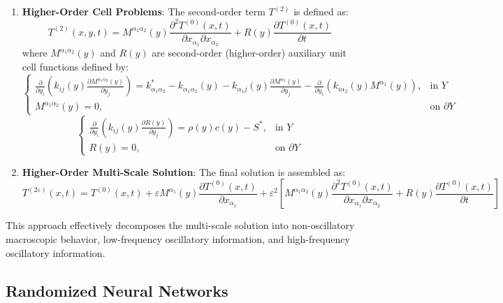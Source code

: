 \documentclass[11pt]{article}
\begin{document}
\begin{enumerate}
    \item \textbf{Higher-Order Cell Problems}: The second-order term $T^{(2)}$ is defined as:
    \begin{equation}
    T^{(2)}(x,y,t) = M^{\alpha_1\alpha_2}(y)\frac{\partial^2 T^{(0)}(x,t)}{\partial x_{\alpha_1}\partial x_{\alpha_2}} + R(y)\frac{\partial T^{(0)}(x,t)}{\partial t}
    \end{equation}
    where $M^{\alpha_1\alpha_2}(y)$ and $R(y)$ are second-order (higher-order) auxiliary unit cell functions defined by:
    \begin{equation}
    \begin{cases}
    \frac{\partial}{\partial y_i}\left(k_{ij}(y)\frac{\partial M^{\alpha_1\alpha_2}(y)}{\partial y_j}\right) = k^*_{\alpha_1\alpha_2} - k_{\alpha_1\alpha_2}(y) - k_{\alpha_1 j}(y)\frac{\partial M^{\alpha_2}(y)}{\partial y_j} - \frac{\partial}{\partial y_i}\left(k_{i\alpha_2}(y)M^{\alpha_1}(y)\right), & \text{in } Y \\
    M^{\alpha_1\alpha_2}(y) = 0, & \text{on } \partial Y
    \end{cases}
    \end{equation}
    \begin{equation}
    \begin{cases}
    \frac{\partial}{\partial y_i}\left(k_{ij}(y)\frac{\partial R(y)}{\partial y_j}\right) = \rho(y)c(y) - S^*, & \text{in } Y \\
    R(y) = 0, & \text{on } \partial Y
    \end{cases}
    \end{equation}
    
    \item \textbf{Higher-Order Multi-Scale Solution}: The final solution is assembled as:
    \begin{equation}
    T^{(2\varepsilon)}(x,t) = T^{(0)}(x,t) + \varepsilon M^{\alpha_1}(y)\frac{\partial T^{(0)}(x,t)}{\partial x_{\alpha_1}} + \varepsilon^2\left[M^{\alpha_1\alpha_2}(y)\frac{\partial^2 T^{(0)}(x,t)}{\partial x_{\alpha_1}\partial x_{\alpha_2}} + R(y)\frac{\partial T^{(0)}(x,t)}{\partial t}\right]
    \end{equation}
\end{enumerate}

This approach effectively decomposes the multi-scale solution into non-oscillatory macroscopic behavior, low-frequency oscillatory information, and high-frequency oscillatory information.

\subsection{Randomized Neural Networks}
\end{document}
